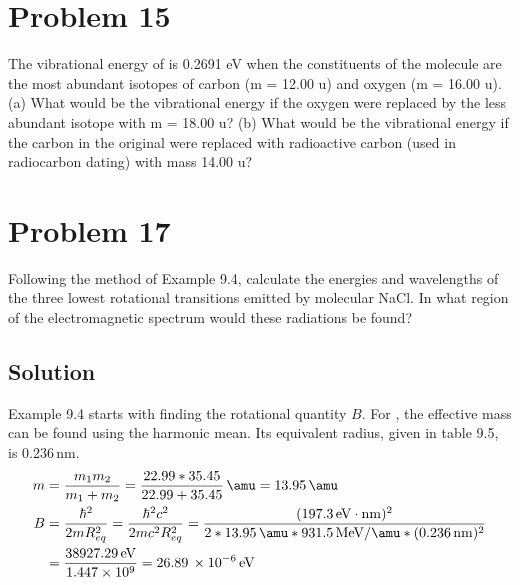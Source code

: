 \documentclass[12pt]{report}
\newcommand{\E}[1]{\times 10^{#1}}
\begin{document}
\section{Problem 15}
    The vibrational energy of  is 0.2691 eV when the constituents of the molecule are the most abundant isotopes of carbon (m = 12.00 u) and oxygen (m = 16.00 u).
    (a) What would be the vibrational energy if the oxygen were replaced by the less abundant isotope with m = 18.00 u?
    (b) What would be the vibrational energy if the carbon in the original  were replaced with radioactive carbon (used in radiocarbon dating) with mass 14.00 u?

\section{Problem 17} %
    Following the method of Example 9.4, calculate the energies and wavelengths of the three lowest rotational transitions emitted by molecular NaCl. 
    In what region of the electromagnetic spectrum would these radiations be found?

    \subsection{Solution}
        Example 9.4 starts with finding the rotational quantity $B$.
        For , the effective mass can be found using the harmonic mean.
        Its equivalent radius, given in table 9.5, is 0.236\,\unit{\nano\meter}.
        \begin{align}
            m   &=  \frac{m_1 m_2}{m_1 + m_2}
                =   \frac{22.99 * 35.45}{22.99 + 35.45}\,\unit{\amu}
                =   13.95\,\unit{\amu}\\
            B   &=  \frac{\hbar^2}{2mR_{eq}^2}
                =   \frac{\hbar^2 c^2}{2mc^2 R_{eq}^2}
                =   \frac{(197.3\,\unit{\eV\cdot\nano\meter})^2}{2 * 13.95\,\unit{\amu} * 931.5\,\unit{\mega\eV/\amu} * (0.236\,\unit{\nano\meter})^2}\\ \addtocounter{equation}{1}
                &=  \frac{38927.29\,\unit{\eV}}{1.447\E{9}}
                =   26.89\,\E{-6}\,\unit{\eV}
        \end{align}
\end{document}
